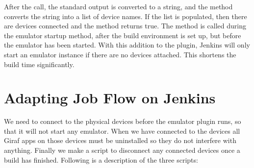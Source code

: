 After the call, the standard output is converted to a string, and the method  converts the string into a list of device names. If the list is populated, then there are devices connected and the method returns true. The method  is called during the emulator startup method, after the build environment is set up, but before the emulator has been started. With this addition to the plugin, Jenkins will only start an emulator instance if there are no devices attached. This shortens the build time significantly.

\section{Adapting Job Flow on Jenkins}
We need to connect to the physical devices before the emulator plugin runs, so that it will not start any emulator. When we have connected to the devices all Giraf apps on those devices must be uninstalled so they do not interfere with anything. Finally we make a script to disconnect any connected devices once a build has finished. Following is a description of the three scripts:

